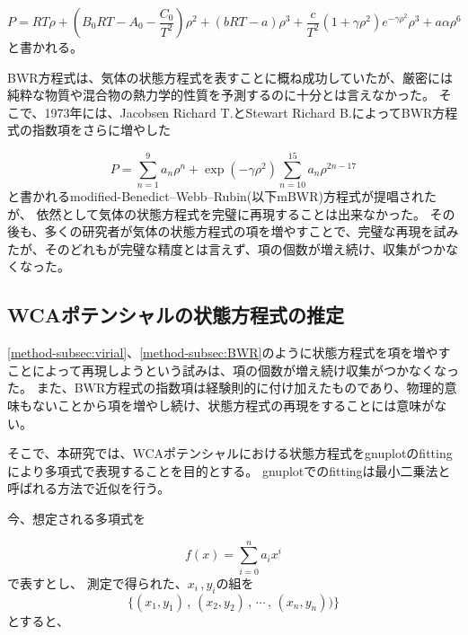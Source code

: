 \documentclass[titlepage]{jsreport}
\begin{document}
{{{\large
\begin{equation}
P=RT{\rho}+\left(B_0RT-A_0-{\frac{C_0}{T^2}}\right){\rho}^2+(bRT-a){\rho}^3+{\frac{c}{T^2}}(1+{\gamma}{\rho}^2)e^{-{\gamma}{\rho}^2}{\rho}^3+a{\alpha}{\rho}^6\label{eq:BWR}
\end{equation}
\normalsize
と書かれる。

BWR方程式は、気体の状態方程式を表すことに概ね成功していたが、厳密には純粋な物質や混合物の熱力学的性質を予測するのに十分とは言えなかった。
そこで、1973年には、Jacobsen Richard T.とStewart Richard B.によってBWR方程式の指数項をさらに増やした

\large
\begin{equation}
P=\sum_{n=1}^9a_n{\rho}^n+\exp(-{\gamma}{\rho}^2)\sum_{n=10}^{15}a_n{\rho}^{2n-17}\label{eq:mBWR}
\end{equation}
\normalsize
と書かれるmodified-Benedict–Webb–Rubin(以下mBWR)方程式が提唱\cite{m-BWR-equation}されたが、
依然として気体の状態方程式を完璧に再現することは出来なかった。
その後も、多くの研究者が気体の状態方程式の項を増やすことで、完璧な再現を試みた\cite{MCCARTY1974276}\cite{BWR-equation:13}\cite{BWR-equation:25}が、そのどれもが完璧な精度とは言えず、項の個数が増え続け、収集がつかなくなった。

\subsection{WCAポテンシャルの状態方程式の推定}\label{method-subsec:WCA-equation}
\ref{method-subsec:virial}、\ref{method-subsec:BWR}のように状態方程式を項を増やすことによって再現しようという試みは、項の個数が増え続け収集がつかなくなった。
また、BWR方程式の指数項は経験則的に付け加えたものであり、物理的意味もないことから項を増やし続け、状態方程式の再現をすることには意味がない。

そこで、本研究では、WCAポテンシャルにおける状態方程式をgnuplot\cite{gnuplot}のfittingにより多項式で表現することを目的とする。
gnuplotでのfittingは最小二乗法と呼ばれる方法で近似を行う。

今、想定される多項式を

\large
\begin{equation}
f(x)=\sum_{i=0}^n a_ix^i\label{eq:poly­nomial}
\end{equation}
\normalsize
で表すとし、
測定で得られた、$x_i$\,,\,$y_i$の組を
\large
\begin{equation}
\{(x_1,y_1)\,,\,(x_2,y_2)\,,\,\cdots\,,\,(x_n,y_n)) \}\label{eq:xy}
\end{equation}
\normalsize
とすると、



}}}
\end{document}
